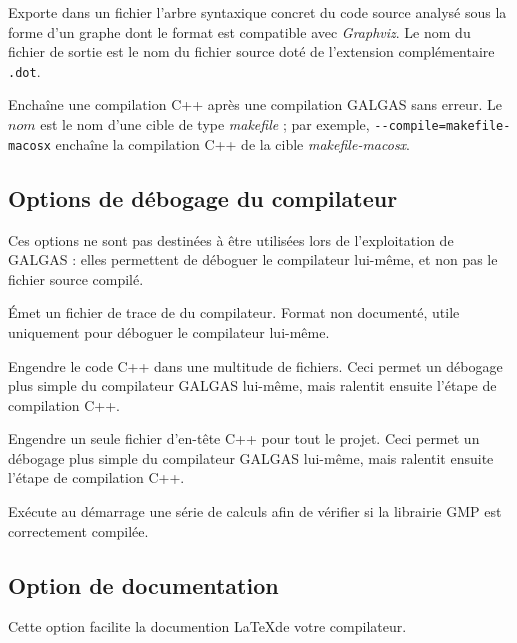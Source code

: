  Exporte dans un fichier l'arbre syntaxique concret du code source analysé sous la forme d'un graphe dont le format est compatible avec \emph{Graphviz}. Le nom du fichier de sortie est le nom du fichier source doté de l'extension complémentaire \texttt{.dot}.


 Enchaîne une compilation C++ après une compilation GALGAS sans erreur. Le $nom$ est le nom d'une cible de type \emph{makefile} ; par exemple, \texttt{-{-}compile=makefile-macosx} enchaîne la compilation C++ de la cible \emph{makefile-macosx}.




\subsection{Options de débogage du compilateur}

Ces options ne sont pas destinées à être utilisées lors de l'exploitation de GALGAS : elles permettent de déboguer le compilateur lui-même, et non pas le fichier source compilé.



 Émet un fichier de trace de du compilateur. Format non documenté, utile uniquement pour déboguer le compilateur lui-même.


 Engendre le code C++ dans une multitude de fichiers. Ceci permet un débogage plus simple du compilateur GALGAS lui-même, mais ralentit ensuite l'étape de compilation C++.


 Engendre un seule fichier d'en-tête C++ pour tout le projet. Ceci permet un débogage plus simple du compilateur GALGAS lui-même, mais ralentit ensuite l'étape de compilation C++.


 Exécute au démarrage une série de calculs afin de vérifier si la librairie GMP est correctement compilée.





\subsection{Option de documentation} Cette option facilite la documention \LaTeX de votre compilateur.

